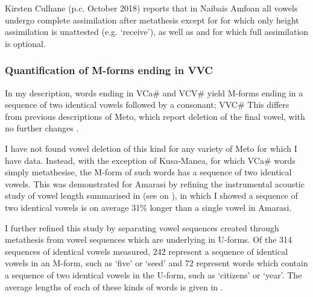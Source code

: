 Kirsten Culhane (p.c. October 2018) reports that in Nai{\Q}bais Amfo{\Q}an
all vowels undergo complete assimilation after metathesis except for 
for which only height assimilation is unattested
(e.g.  {\ra}  `receive'),
as well as  and  for which full assimilation is optional.

\subsubsection{Quantification of M-forms ending in V{\A}V{\A}C}\label{sec:QuaMfoEndVVC}
In my description, words ending in VCa{\#} and V{\sA}CV{\sA}{\#}
yield M-forms ending in a sequence of two identical vowels followed
by a consonant; V{\sA}V{\sA}C{\#}
This differs from previous descriptions of Meto,
which report deletion of the final vowel, with no further changes
\citep{st93,st96,st96b,mccko96,blga98,st08}.

I have not found vowel deletion of this kind
for any variety of Meto for which I have data.
Instead, with the exception of Kusa-Manea, for which
VCa{\#} words simply metathesise,
the M-form of such words has a sequence of two identical vowels.
This was demonstrated for Amarasi
by refining the instrumental acoustic study of vowel length
summarised in 
(see  on ),
in which I showed a sequence of two identical vowels
is on average 31{\%} longer than a single vowel in Amarasi.

I further refined this study by separating
vowel sequences created through metathesis
from vowel sequences which are underlying in U-forms.
Of the 314 sequences of identical vowels measured,
242 represent a sequence of identical vowels in an M-form,
such as  {\ra}  `five' or  {\ra}  `seed'
and 72 represent words which contain a sequence of two identical vowels in the U-form,
such as  `citizens' or  `year'.
The average lengths of each of these kinds of words is given in .

